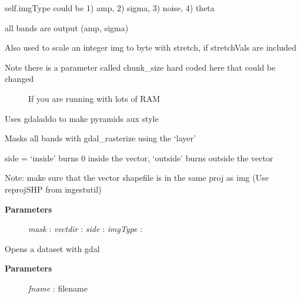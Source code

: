 \documentclass[letterpaper,10pt,english]{sphinxmanual}
\begin{document}
\begin{fulllineitems}
\begin{fulllineitems}
self.imgType could be 1) amp, 2) sigma, 3) noise, 4) theta

all bands are output (amp, sigma)

Also used to scale an integer img to byte with stretch, if stretchVals are included
\begin{description}
\item[{Note there is a parameter called chunk\_size hard coded here that could be changed }] \leavevmode
If you are running with lots of RAM

\end{description}

\end{fulllineitems}


\begin{fulllineitems}
\label{code:Image.Image.makePyramids}
Uses gdaladdo to make pyramids aux style

\end{fulllineitems}


\begin{fulllineitems}
\label{code:Image.Image.maskImg}
Masks all bands with gdal\_rasterize using the `layer'

side = `inside' burns 0 inside the vector, `outside' burns outside the vector

Note: make sure that the vector shapefile is in the same proj as img (Use reprojSHP from ingestutil)
\begin{description}
\item[{\textbf{Parameters}}] \leavevmode
\emph{mask}  :
\emph{vectdir}   :
\emph{side}  :
\emph{imgType}   :

\end{description}

\end{fulllineitems}


\begin{fulllineitems}
\label{code:Image.Image.openDataset}
Opens a dataset with gdal
\begin{description}
\item[{\textbf{Parameters}}] \leavevmode
\emph{fname} : filename


\end{description}
\end{fulllineitems}
\end{fulllineitems}
\end{document}
